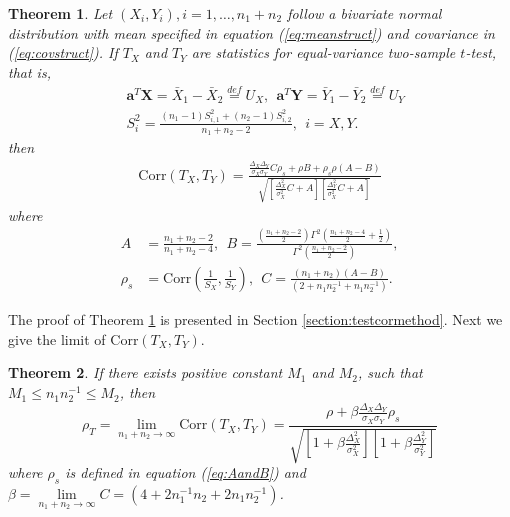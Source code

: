 \documentclass[12pt, a4paper]{article}
\newtheorem{theorem}{Theorem}       %
\newcommand{\cor}{\text{Corr}}
\begin{document}
	
	\begin{theorem}\label{thm:tstat}
		Let $(X_i, Y_i), i = 1, \ldots, n_1 + n_2$ follow a bivariate normal distribution with mean specified in equation (\ref{eq:meanstruct}) and covariance in (\ref{eq:covstruct}). If $T_X$ and $T_Y$ are statistics for equal-variance two-sample $t$-test, that is, 
		\begin{equation}\label{eq:tstatform}
			\begin{aligned}
				&\bm a^T\bm X  = \bar{X}_1 - \bar{X}_2 \stackrel{def}{= }U_X, ~~\bm a^T\bm Y = \bar{Y}_1 -\bar{Y}_2 \stackrel{def}{=}U_Y \\
				&S_i^2 = \frac{(n_1-1)S_{i, 1}^2 + (n_2 -1)S_{i,2}^2}{n_1 + n_2 -2}, ~~i = X, Y.
			\end{aligned}
		\end{equation}
		then 
		\begin{equation}\label{eq:ttestcor}
	\begin{aligned}
	 \cor(T_X, T_Y) =   
	 \frac{\frac{\Delta_X\Delta_Y}{\sigma_X\sigma_Y}C \rho_{s}+ \rho B
		+ \rho_{s}\rho(A-B)}{\sqrt{\left[ \frac{\Delta_X^2}{\sigma_X^2}C + A\right]\left[\frac{\Delta_Y^2}{\sigma_X^2}C +   A\right]}}
	\end{aligned}
		\end{equation}
	where 
			 \begin{equation}\label{eq:AandB}
			 	 \begin{aligned}
			 	 A & = \frac{n_1 + n_2-2}{n_1 + n_2-4}, ~~B =
			 	 \frac{(\frac{n_1 + n_2 -2}{2})\Gamma^2(\frac{n_1 + n_2 -4}{2} + \frac{1}{2})}{\Gamma^2(\frac{n_1+ n_2 -2}{2})}, \\
			 	 \rho_s & = \cor(\frac{1}{S_X}, \frac{1}{S_Y}), ~~ 
			 	 C = \frac{(n_1 + n_2)(A-B)}{(2 + n_1n_2^{-1} + n_1n_2^{-1})}.
			 	 \end{aligned}
			 \end{equation}	 
	\end{theorem}
	The proof of Theorem \ref{thm:tstat} is presented in Section \ref{section:testcormethod}. Next we give the limit of $\cor(T_X, T_Y)$.
	\begin{theorem}\label{thm:rholimit}
	  	If there exists positive constant $M_1$ and $M_2$, such that $M_1 \leq n_1n_2^{-1}\leq M_2$, then
	   \begin{equation}\label{limitT}
	   \rho_T=\lim\limits_{n_1 + n_2 \rightarrow \infty} \cor(T_X, T_Y) = \frac{\rho +
	   	\beta\frac{\Delta_X\Delta_Y}{\sigma_X\sigma_Y}\rho_{s}}{\sqrt{  \left[ 1 +\beta\frac{\Delta_X^2}{\sigma_X^2}\right]\left[ 1 + \beta\frac{\Delta_Y^2}{\sigma_Y^2}\right]}}
	   \end{equation}
	   where $\rho_{s}$ is defined in equation (\ref{eq:AandB}) and $\beta = \lim\limits_{n_1 + n_2 \rightarrow \infty}C = (4 + 2n_1^{-1}n_2 + 2n_1n_2^{-1})$.
	\end{theorem}
\end{document}
